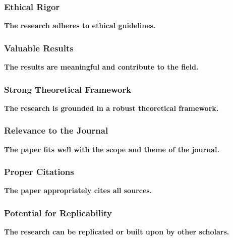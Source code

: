 \documentclass[handout]{beamer}
\begin{document}
\begin{frame}[plain]
\centering
\frametitle{Ethical Rigor}
\begin{framed}
\Large\textbf{The research adheres to ethical guidelines.}
\end{framed}
\end{frame}
\begin{frame}[plain]
\centering
\frametitle{Valuable Results}
\begin{framed}
\Large\textbf{The results are meaningful and contribute to the field.}
\end{framed}
\end{frame}
\begin{frame}[plain]
\centering
\frametitle{Strong Theoretical Framework}
\begin{framed}
\Large\textbf{The research is grounded in a robust theoretical framework.}
\end{framed}
\end{frame}
\begin{frame}[plain]
\centering
\frametitle{Relevance to the Journal}
\begin{framed}
\Large\textbf{The paper fits well with the scope and theme of the journal.}
\end{framed}
\end{frame}
\begin{frame}[plain]
\centering
\frametitle{Proper Citations}
\begin{framed}
\Large\textbf{The paper appropriately cites all sources.}
\end{framed}
\end{frame}
\begin{frame}[plain]
\centering
\frametitle{Potential for Replicability}
\begin{framed}
\Large\textbf{The research can be replicated or built upon by other scholars.}
\end{framed}
\end{frame}
\end{document}
